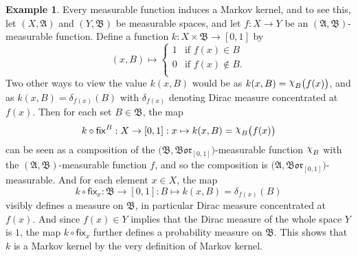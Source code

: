 \documentclass[
twoside=true,
paper=letter,
fontsize=9pt,
pagesize=auto,
leqno,
openany,
headsepline,
overfullrule,
]{scrbook}
\theoremstyle{plain}
\theoremstyle{plain}
\theoremstyle{definition}
\newtheorem{example}[thm]{Example}
\theoremstyle{bfnoteitalic}
\theoremstyle{bfnoteroman}
\newcommand{\sigalg}[1]{\mathfrak{#1}}
\newcommand{\sfop}[1]{\mathsf{#1}}
\newcommand{\borel}{\mathfrak{Bor}}
\newcommand{\charfunction}[1]{\mathop{{\raisebox{2pt}{$\chi$}}_{#1}}}
\newcommand{\sigmaalgebra}{\sigalg{A}}
\newcommand{\sigmaalgebraii}{\sigalg{B}}
\newcommand{\function}{f}
\newcommand{\measurespace}{X}
\newcommand{\measurespaceii}{Y}
\newcommand{\mspaceelt}{x}
\newcommand{\diracmeasure}[1]{\delta_{#1}}
\newcommand{\setii}{B}
\newcommand{\markovkernel}{k}
\newcommand{\fixinthefirst}[1]{\sfop{fix}_{#1}}
\newcommand{\fixinthesecond}[1]{\sfop{fix}^{#1}}
\begin{document}
\begin{example}
Every measurable function induces a Markov kernel, and to see this, let
$(\measurespace, \sigmaalgebra)$ and 
$(\measurespaceii, \sigmaalgebraii)$ be measurable spaces, and let 
$\function: \measurespace \to \measurespaceii$ be an $(\sigmaalgebra, \sigmaalgebraii)$\hyp{}measurable function. 
Define a function $\markovkernel:\measurespace\times\sigmaalgebraii\to [0,1]$ by
\[
(\mspaceelt,\setii) \mapsto
\begin{cases}
1 & \text{if $\function(\mspaceelt) \in\setii$} \\
0 & \text{if $\function(\mspaceelt) \notin\setii$.} \\
\end{cases}
\]
Two other ways to view the value $\markovkernel(\mspaceelt, \setii)$ would be as 
$\markovkernel(\mspaceelt, \setii)
= 
\charfunction{\setii}\bigl(\function(\mspaceelt)\bigr)$,
and as
$\markovkernel(\mspaceelt, \setii)
=
\diracmeasure{\function(\mspaceelt)}(\setii)$ with 
$\diracmeasure{\function(\mspaceelt)}$ denoting Dirac measure concentrated at 
$\function(\mspaceelt)$.
Then for each set $\setii\in\sigmaalgebraii$, the map
\[
\markovkernel\circ\fixinthesecond{\setii}
: \measurespace\to [0,1]
: \mspaceelt\mapsto \markovkernel(\mspaceelt, \setii)
= 
\charfunction{\setii}\bigl(\function(\mspaceelt)\bigr)
\]
can be seen as a composition of the 
$\bigl(\sigmaalgebraii, \borel_{[0,1]}\bigr)$\hyp{}measurable function $\charfunction{\setii}$ with the 
$(\sigmaalgebra, \sigmaalgebraii)$\hyp{}measurable function 
$\function$, and so the composition is 
$\bigl(\sigmaalgebra, \borel_{[0,1]}\bigr)$\hyp{}measurable.
And for each element
$\mspaceelt\in\measurespace$,  the map
\[
\markovkernel\circ\fixinthefirst{\mspaceelt}
: \sigmaalgebraii\to [0,1]
: \setii\mapsto \markovkernel(\mspaceelt, \setii)
= 
\diracmeasure{\function(\mspaceelt)}(\setii)
\]
visibly defines a measure on
$\sigmaalgebraii$, in particular Dirac measure concentrated at 
$\function(\mspaceelt)$.  And since $\function(\mspaceelt)\in\measurespaceii$ implies that the Dirac measure of the whole space $\measurespaceii$ is $1$, the map 
$\markovkernel\circ\fixinthefirst{\mspaceelt}$ further defines a probability measure on
$\sigmaalgebraii$. 
This shows that $\markovkernel$ is a Markov kernel by the very definition of Markov kernel.
\end{example}
\end{document}
